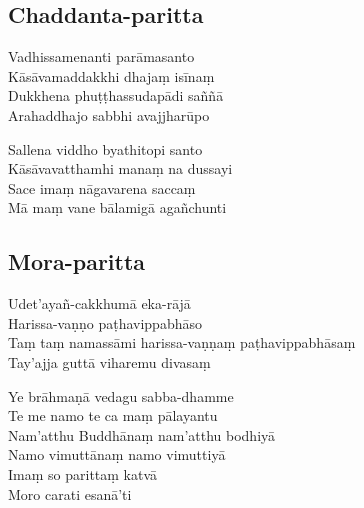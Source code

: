 \subsection{Chaddanta-paritta}
\label{vadhissamenanti}



\begin{paritta}
Vadhissamenanti parāmasanto\\
Kāsāvamaddakkhi dhajaṃ isīnaṃ\\
Dukkhena phuṭṭhassudapādi saññā\\
Arahaddhajo sabbhi avajjharūpo

Sallena viddho byathitopi santo\\
Kāsāvavatthamhi manaṃ na dussayi\\
Sace imaṃ nāgavarena saccaṃ\\
Mā maṃ vane bālamigā agañchunti
\end{paritta}

\subsection{Mora-paritta}
\label{udetayan-cakkhuma}


\enlargethispage{\baselineskip}

\vspace*{-.5\baselineskip}


\vspace*{-.2\baselineskip}

Udet'ayañ-cakkhumā eka-rājā\\
Harissa-vaṇṇo paṭhavippabhāso\\
Taṃ taṃ namassāmi harissa-vaṇṇaṃ paṭhavippabhāsaṃ\\
Tay'ajja guttā viharemu divasaṃ

Ye brāhmaṇā vedagu sabba-dhamme\\
Te me namo te ca maṃ pālayantu\\
Nam'atthu Buddhānaṃ nam'atthu bodhiyā\\
Namo vimuttānaṃ namo vimuttiyā\\
Imaṃ so parittaṃ katvā\\
Moro carati esanā'ti

\vspace*{-.1\baselineskip}


